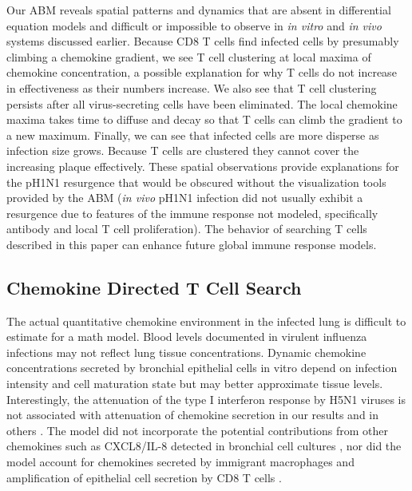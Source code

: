 \documentclass[10pt]{article}
\begin{document}
Our ABM reveals spatial patterns and dynamics that are absent in differential equation models and difficult or impossible to observe in \textit{in vitro} and \textit{in vivo} systems discussed earlier.  Because CD8 T cells find infected cells by presumably climbing a chemokine gradient, we see T cell clustering at local maxima of chemokine concentration, a possible explanation for why T cells do not increase in effectiveness as their numbers increase.   We also see that T cell clustering persists after all virus-secreting cells have been eliminated.  The local chemokine maxima takes time to diffuse and decay so that T cells can climb the gradient to a new maximum.  Finally, we can see that infected cells are more disperse as infection size grows.  Because T cells are clustered they cannot cover the increasing plaque effectively.  These spatial observations provide explanations for the pH1N1 resurgence that would be obscured without the visualization tools provided by the ABM (\textit{in vivo} pH1N1 infection did not usually exhibit a resurgence due to features of the immune response not modeled, specifically antibody and local T cell proliferation).   The behavior of searching T cells described in this paper can enhance future global immune response models.

\subsection*{Chemokine Directed T Cell Search}

The actual quantitative chemokine environment in the infected lung is difficult to estimate for a math model.  Blood levels documented in virulent influenza infections \cite{DeJong2006} may not reflect lung tissue concentrations.  Dynamic chemokine concentrations secreted by bronchial epithelial cells in vitro depend on infection intensity and cell maturation state \cite{Mitchell2011, Chan2010, Chan2005, Zeng2011} but may better approximate tissue levels.  Interestingly, the attenuation of the type I interferon response by H5N1 viruses is not associated with attenuation of chemokine secretion in our results and in others \cite{Zeng2007}.  The model did not incorporate the potential contributions from other chemokines such as CXCL8/IL-8 detected in bronchial cell cultures \cite{Matsukura1996, Arndt2002}, nor did the model account for chemokines secreted by immigrant macrophages \cite{Julkunen2000} and amplification of epithelial cell secretion by CD8 T cells \cite{Zhao2000}.
\end{document}
